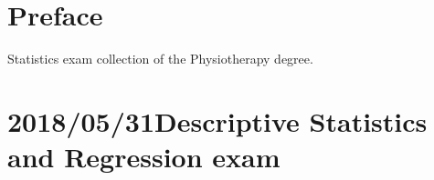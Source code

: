 \documentclass[
  a4paper,
]{scrreport}
\theoremstyle{definition}
\theoremstyle{remark}
\begin{document}
\hypertarget{preface}{%
\chapter*{Preface}\label{preface}}


Statistics exam collection of the Physiotherapy degree.


\hypertarget{descriptive-statistics-and-regression-exam}{%
\chapter{\texorpdfstring{2018/05/31Descriptive Statistics and Regression
exam}{2018/05/31 Descriptive Statistics and Regression exam}}\label{descriptive-statistics-and-regression-exam}}
\end{document}
